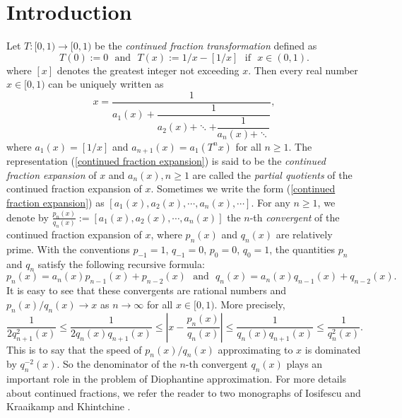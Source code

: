 \documentclass[reqno]{amsart}
\theoremstyle{definition}
\numberwithin{equation}{section}
\begin{document}
\section{Introduction}
Let $T: [0,1) \longrightarrow [0,1)$ be the \emph{continued fraction transformation} defined as
\begin{equation*}
T(0):=0\ \ \  \text{and}\ \ \ T(x):= 1/x- [1/x]\ \ \  \text{if}\ \ \  x \in (0,1).
\end{equation*}
where $[x]$ denotes the greatest integer not exceeding $x$.
Then every real number $x \in [0,1)$ can be uniquely written as
\begin{equation}\label{continued fraction expansion}
x = \dfrac{1}{a_1(x) +\dfrac{1}{a_2(x) + \ddots +\dfrac{1}{a_n(x)+ \ddots}}},
\end{equation}
where $a_1(x) = [1/x]$ and $a_{n +1}(x) = a_1(T^nx)$ for all $n \geq 1$. The representation (\ref{continued fraction expansion}) is said to be the \emph{continued fraction expansion} of $x$ and $a_n(x), n \geq 1$  are called the \emph{partial quotients} of the continued fraction expansion of $x$.  Sometimes we write the form (\ref{continued fraction expansion}) as $[a_1(x), a_2(x), \cdots, a_n(x), \cdots]$. For any $n \geq 1$, we denote by $\frac{p_n(x)}{q_n(x)}:= [a_1(x), a_2(x), \cdots, a_n(x)]$ the $n$-th \emph{convergent} of the continued fraction expansion of $x$, where $p_n(x)$ and $q_n(x)$ are relatively prime. With the conventions $p_{-1}=1$, $q_{-1}=0$, $p_0=0$, $q_0=1$, the quantities $p_n$ and $q_n$ satisfy the following recursive formula:
\begin{equation}\label{recursive}
p_n(x) = a_n(x) p_{n-1}(x) + p_{n-2}(x)\ \ \ \text{and}\ \ \ q_n(x) = a_n(x) q_{n-1}(x) + q_{n-2}(x).
\end{equation}
It is easy to see that these convergents are rational numbers and $p_n(x)/q_n(x) \rightarrow x$ as $n \rightarrow \infty$ for all $x \in [0,1)$. More precisely,
\begin{equation}\label{diophantine}
\frac{1}{2q_{n+1}^2(x)} \leq \frac{1}{2q_n(x)q_{n+1}(x)} \leq \left|x-\frac{p_n(x)}{q_n(x)}\right| \leq \frac{1}{q_n(x)q_{n+1}(x)} \leq \frac{1}{q_n^2(x)}.
\end{equation}
This is to say that the speed of $p_n(x)/q_n(x)$ approximating to $x$ is dominated by $q_n^{-2}(x)$. So the denominator of the $n$-th convergent $q_n(x)$ plays an important role in the problem of Diophantine approximation. For more details about continued fractions, we refer the reader to two monographs of Iosifescu and Kraaikamp \cite{lesIK02} and Khintchine \cite{lesKhi64}.
\end{document}
